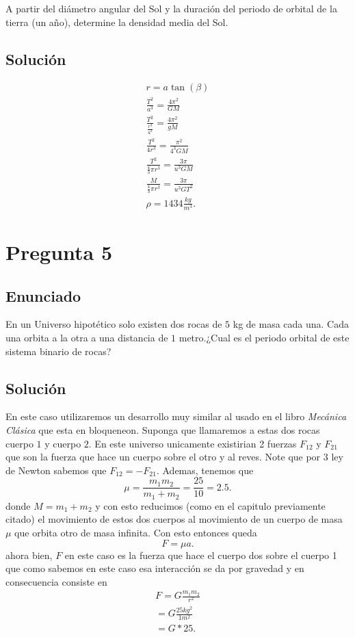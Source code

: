 \documentclass[12pt]{article}
\begin{document}
A partir del diámetro angular del Sol y la duración del periodo de orbital de la tierra (un año), determine la densidad media del Sol.

\subsection*{Solución}

\begin{align*}
  r = a\tan\left( \beta \right) \\
  \frac{T^2}{a^{3}} = \frac{4\pi^2}{GM}\\
  \frac{T^2}{\frac{r^{3}}{u^{3}}} = \frac{4\pi^2}{gM}\\
  \frac{T^2}{4r^{3}}= \frac{\pi^2}{4^{3}GM}\\
  \frac{T^2}{\frac{4}{3}\pi r^{3}} = \frac{3\pi}{u^{3}GM}\\
  \frac{M}{\frac{4}{3}\pi r^{3}}=\frac{3\pi}{u^{3}G T^2}\\
  \rho = 1434 \frac{kg}{m^3}
.\end{align*}


\section*{Pregunta 5}

\subsection*{Enunciado}

En un Universo hipotético solo existen dos rocas de $5$ kg de masa cada una. Cada una orbita a la otra a una distancia de $1$ metro.¿Cual es el periodo orbital de este sistema binario de rocas?

\subsection*{Solución}

En este caso utilizaremos un desarrollo muy similar al usado en el libro \textit{Mecánica Clásica} que esta en bloqueneon. Suponga que llamaremos a estas dos rocas cuerpo $1$ y cuerpo $2$. En este universo unicamente existirian 2 fuerzas  $F_{12}$ y $F_{21}$ que son la fuerza que hace un cuerpo sobre el otro y al reves. Note que por $3$ ley de Newton sabemos que $F_{12}=-F_{21}$. Ademas, tenemos que \[
\mu = \frac{m_1m_2}{m_1+m_2} = \frac{25}{10} = 2.5
.\] donde $M=m_1+m_2$ y con esto reducimos (como en el capitulo previamente citado) el movimiento de estos dos cuerpos al movimiento de un cuerpo de masa $\mu$ que orbita otro de masa infinita. Con esto entonces queda \[
F = \mu a
.\] ahora bien,  $F$ en este caso es la fuerza que hace el cuerpo dos sobre el cuerpo 1 que como sabemos en este caso esa interacción se da por gravedad y en consecuencia consiste en 
\begin{align*}
  F = G \frac{m_1m_2}{r^2}\\
  = G \frac{25 kg^2}{1 m^2}\\
  = G*25
.\end{align*}
\end{document}
